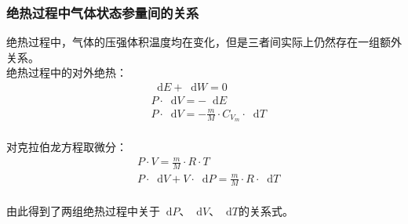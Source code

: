 \documentclass[UTF8]{ctexart}
\newcommand*{\dif}{\mathop{}\!\mathrm{d}}
\begin{document}
\subsubsection{绝热过程中气体状态参量间的关系}
    \setcounter{equation}{0}
    绝热过程中，气体的压强体积温度均在变化，但是三者间实际上仍然存在一组额外关系。\\[3mm]
    绝热过程中的对外绝热：
    \begin{align}
        &\dif E+\dif W=0\\[3mm]
        &P\cdot \dif V=-\dif E\\[3mm]
        &P\cdot \dif V=-\frac{m}{M}\cdot C_{V_m}\cdot\dif T
    \end{align}\\
    对克拉伯龙方程取微分：
    \begin{align}
        &P\cdot V=\frac{m}{M}\cdot R\cdot T\\[3mm]
        &P\cdot\dif V+V\cdot\dif P=\frac{m}{M}\cdot R\cdot \dif T
    \end{align}\\
    由此得到了两组绝热过程中关于$\dif P$、$\dif V$、$\dif T$的关系式。

\newpage
\end{document}
